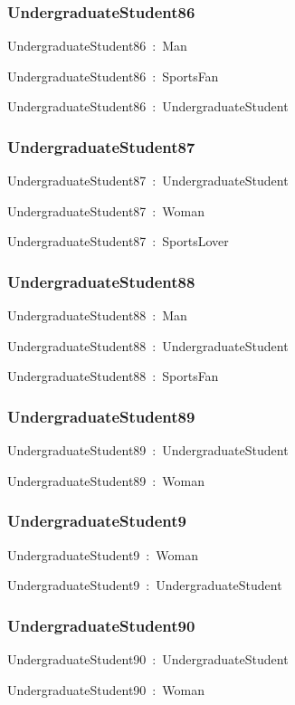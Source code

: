 \documentclass{article}
\begin{document}
\subsubsection*{UndergraduateStudent86}

UndergraduateStudent86~:~Man

UndergraduateStudent86~:~SportsFan

UndergraduateStudent86~:~UndergraduateStudent

\subsubsection*{UndergraduateStudent87}

UndergraduateStudent87~:~UndergraduateStudent

UndergraduateStudent87~:~Woman

UndergraduateStudent87~:~SportsLover

\subsubsection*{UndergraduateStudent88}

UndergraduateStudent88~:~Man

UndergraduateStudent88~:~UndergraduateStudent

UndergraduateStudent88~:~SportsFan

\subsubsection*{UndergraduateStudent89}

UndergraduateStudent89~:~UndergraduateStudent

UndergraduateStudent89~:~Woman

\subsubsection*{UndergraduateStudent9}

UndergraduateStudent9~:~Woman

UndergraduateStudent9~:~UndergraduateStudent

\subsubsection*{UndergraduateStudent90}

UndergraduateStudent90~:~UndergraduateStudent

UndergraduateStudent90~:~Woman
\end{document}
